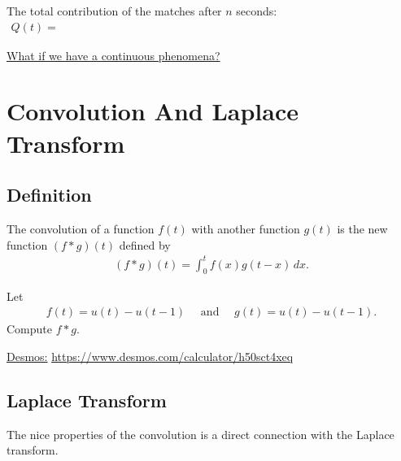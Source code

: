 \documentclass[12pt,a4paper]{article}
\newcounter{example}[section]
\begin{document}
\vspace*{12pt}

The total contribution of the matches after $n$ seconds:
	\begin{align*}
	Q(t) = \phantom{2222222222222222222222222222222222222222222222222222222222222222} 
	\end{align*}
	
\vspace*{16pt}

\underline{What if we have a continuous phenomena?}

\newpage

\section{Convolution And Laplace Transform}

\subsection{Definition}
The convolution of a function $f(t)$ with another function $g(t)$ is the new function $(f \ast g) (t)$ defined by
	\begin{align*}
	(f \ast g) (t) = \int_0^t f(x) g(t - x) \, dx .
	\end{align*}
	
\vspace*{16pt}

\begin{example}
Let 
	\begin{align*}
	f(t) = u (t) - u(t - 1) \quad \text{ and } \quad g(t) = u (t) - u(t - 1) .
	\end{align*}
Compute $f \ast g$.
\end{example}

\vfill

\newpage

\phantom{2}

\vfill

\underline{Desmos:} \url{https://www.desmos.com/calculator/h50sct4xeq}

\newpage

\subsection{Laplace Transform}

The nice properties of the convolution is a direct connection with the Laplace transform.

\vspace*{16pt}
\end{document}
